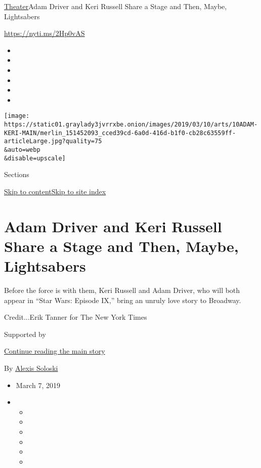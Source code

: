 \href{/section/theater}{Theater}\textbar{}Adam Driver and Keri Russell
Share a Stage and Then, Maybe, Lightsabers

\url{https://nyti.ms/2Hp0vAS}

\begin{itemize}
\item
\item
\item
\item
\item
\item
\end{itemize}

\texttt{[image: https://static01.graylady3jvrrxbe.onion/images/2019/03/10/arts/10ADAM-KERI-MAIN/merlin\_151452093\_cced39cd-6a0d-416d-b1f0-cb28c63559ff-articleLarge.jpg?quality=75\\\&auto=webp\\\&disable=upscale]}

Sections

\protect\hyperlink{site-content}{Skip to
content}\protect\hyperlink{site-index}{Skip to site index}

\hypertarget{adam-driver-and-keri-russell-share-a-stage-and-then-maybe-lightsabers}{%
\section{Adam Driver and Keri Russell Share a Stage and Then, Maybe,
Lightsabers}\label{adam-driver-and-keri-russell-share-a-stage-and-then-maybe-lightsabers}}

Before the force is with them, Keri Russell and Adam Driver, who will
both appear in ``Star Wars: Episode IX,'' bring an unruly love story to
Broadway.

Credit...Erik Tanner for The New York Times

Supported by

\protect\hyperlink{after-sponsor}{Continue reading the main story}

By \href{https://www.nytimes3xbfgragh.onion/by/alexis-soloski}{Alexis
Soloski}

\begin{itemize}
\item
  March 7, 2019
\item
  \begin{itemize}
  \item
  \item
  \item
  \item
  \item
  \item
  \end{itemize}
\end{itemize}

